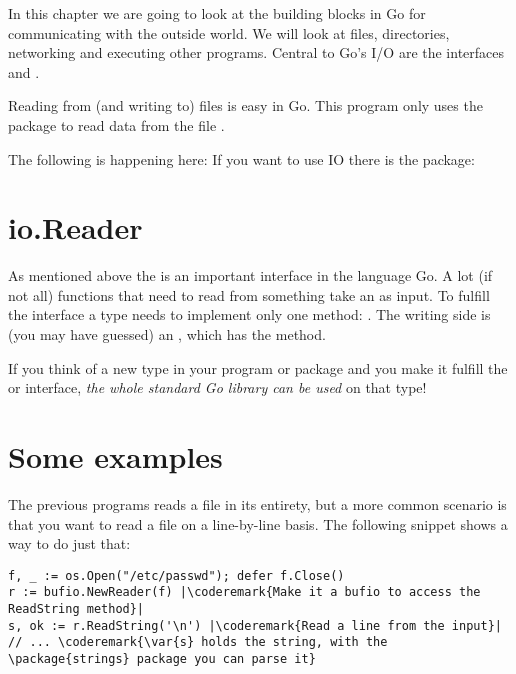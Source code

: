 \noindent{}In this chapter we are going to look at the building blocks in Go for 
communicating with the outside world. We will look at files, directories, networking
and executing other programs. Central to Go's I/O are the interfaces 
and .

Reading from (and writing to) files is easy in Go. This program
only uses the  package to read data from the file .

The following is happening here:
\showremarks
If you want to use  IO there is the
 package:

\showremarks

\section{io.Reader}
As mentioned above the  is an important interface in the language Go. A lot
(if not all) functions that need to read from something take an 
as input. To fulfill the interface a type needs to implement only one method: . The writing side is (you may have guessed) an , which has
the  method.

If you think of a new type in your program or package and you make it fulfill the 
or  interface, \emph{the whole standard Go library can be used} on that type!

\section{Some examples}
The previous programs reads a file in its entirety, but a more common scenario is that
you want to read a file on a line-by-line basis. The following snippet shows a way
to do just that:

\begin{lstlisting}
f, _ := os.Open("/etc/passwd"); defer f.Close()
r := bufio.NewReader(f) |\coderemark{Make it a bufio to access the ReadString method}|
s, ok := r.ReadString('\n') |\coderemark{Read a line from the input}|
// ... \coderemark{\var{s} holds the string, with the \package{strings} package you can parse it}
\end{lstlisting}


